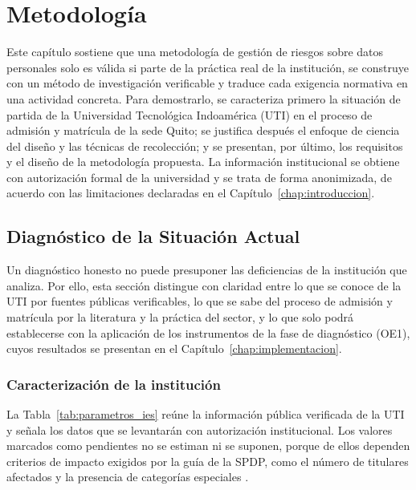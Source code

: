 \chapter{Metodología}
\label{chap:metodologia}

Este capítulo sostiene que una metodología de gestión de riesgos sobre datos personales solo es válida si parte de la práctica real de la institución, se construye con un método de investigación verificable y traduce cada exigencia normativa en una actividad concreta. Para demostrarlo, se caracteriza primero la situación de partida de la Universidad Tecnológica Indoamérica (UTI) en el proceso de admisión y matrícula de la sede Quito; se justifica después el enfoque de ciencia del diseño y las técnicas de recolección; y se presentan, por último, los requisitos y el diseño de la metodología propuesta. La información institucional se obtiene con autorización formal de la universidad y se trata de forma anonimizada, de acuerdo con las limitaciones declaradas en el Capítulo~\ref{chap:introduccion}.

\section{Diagnóstico de la Situación Actual}
\label{sec:diagnostico_actual}

Un diagnóstico honesto no puede presuponer las deficiencias de la institución que analiza. Por ello, esta sección distingue con claridad entre lo que se conoce de la UTI por fuentes públicas verificables, lo que se sabe del proceso de admisión y matrícula por la literatura y la práctica del sector, y lo que solo podrá establecerse con la aplicación de los instrumentos de la fase de diagnóstico (OE1), cuyos resultados se presentan en el Capítulo~\ref{chap:implementacion}.

\subsection{Caracterización de la institución}

La Tabla~\ref{tab:parametros_ies} reúne la información pública verificada de la UTI y señala los datos que se levantarán con autorización institucional. Los valores marcados como pendientes no se estiman ni se suponen, porque de ellos dependen criterios de impacto exigidos por la guía de la SPDP, como el número de titulares afectados y la presencia de categorías especiales \cite{spdp2026guiav2}.


